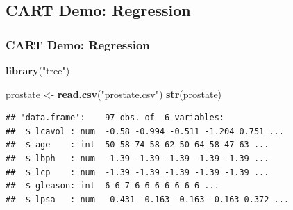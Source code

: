 \documentclass[
  shownotes,
  xcolor={svgnames},
  hyperref={colorlinks,citecolor=DarkBlue,linkcolor=DarkRed,urlcolor=DarkBlue}
  ]{beamer}
\newenvironment{Shaded}{\begin{snugshade}}{\end{snugshade}}
\newcommand{\KeywordTok}[1]{\textcolor[rgb]{0.13,0.29,0.53}{\textbf{#1}}}
\newcommand{\NormalTok}[1]{#1}
\newcommand{\StringTok}[1]{\textcolor[rgb]{0.31,0.60,0.02}{#1}}
\begin{document}
\subsection{CART Demo: Regression}
\begin{frame}[fragile]
\frametitle{CART Demo: Regression}

\begin{tiny}
\begin{Shaded}
\begin{Highlighting}[]
\KeywordTok{library}\NormalTok{(}\StringTok{"tree"}\NormalTok{)}

\NormalTok{prostate \textless{}{-}}\StringTok{ }\KeywordTok{read.csv}\NormalTok{(}\StringTok{"prostate.csv"}\NormalTok{)}
\KeywordTok{str}\NormalTok{(prostate)}
\end{Highlighting}
\end{Shaded}
\end{tiny}

\begin{tiny}
\begin{verbatim}
## 'data.frame':    97 obs. of  6 variables:
##  $ lcavol : num  -0.58 -0.994 -0.511 -1.204 0.751 ...
##  $ age    : int  50 58 74 58 62 50 64 58 47 63 ...
##  $ lbph   : num  -1.39 -1.39 -1.39 -1.39 -1.39 ...
##  $ lcp    : num  -1.39 -1.39 -1.39 -1.39 -1.39 ...
##  $ gleason: int  6 6 7 6 6 6 6 6 6 6 ...
##  $ lpsa   : num  -0.431 -0.163 -0.163 -0.163 0.372 ...
\end{verbatim}
\end{tiny}

\end{frame}
\end{document}
